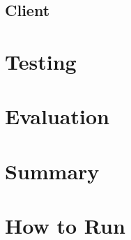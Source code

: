 \documentclass[12pt]{article}
\begin{document}
\subsection{Client}

\section{Testing}

\section{Evaluation}

\section{Summary}

\section{How to Run}



\end{document}
